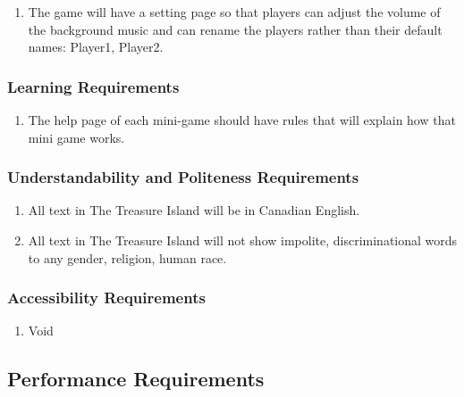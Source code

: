 \documentclass[]{article}
\begin{document}
\begin{enumerate}[{UH}1. ]
	\item The game will have a setting page so that players can adjust the volume of the background music and can rename the players rather than their default names: Player1, Player2.
\end{enumerate}


\subsubsection{Learning Requirements}
\label{ssub:learning_requirements}

\begin{enumerate}[{UH}1. ]
	\item The help page of each mini-game should have rules that will explain how that mini game works.
\end{enumerate}


\subsubsection{Understandability and Politeness Requirements}
\label{ssub:understandability_and_politeness_requirements}

\begin{enumerate}[{UH}1. ]
	\item All text in The Treasure Island will be in Canadian English.
	\item All text in The Treasure Island will not show impolite, discriminational words to any gender, religion, human race.
\end{enumerate}


\subsubsection{Accessibility Requirements}
\label{ssub:accessibility_requirements}
\begin{enumerate}[{UH}1. ]
	\item Void
\end{enumerate}


\subsection{Performance Requirements}
\label{sub:performance_requirements}
\end{document}
